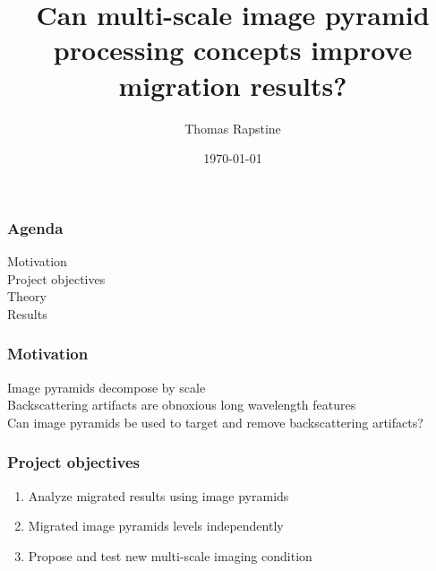 \title{Can multi-scale image pyramid processing concepts improve migration results?}
\author{Thomas Rapstine}
\date{\today}

\newcommand\FontSm{\fontsize{10pt}{5.0}\selectfont}
\newcommand\FontMd{\fontsize{14pt}{5.0}\selectfont}
\newcommand\FontLg{\fontsize{14pt}{5.0}\selectfont}

\maketitle
{}

\begin{frame} \frametitle{Agenda}
  \FontMd
  \begin{centering}
    Motivation \\
    \vspace{0.3in}
    Project objectives  \\
    \vspace{0.3in}
    Theory \\
    \vspace{0.3in}
    Results \\
  \end{centering}
\end{frame}

\begin{frame} \frametitle{Motivation}
  \FontMd
  \begin{centering}
    \vspace{0.4in}
    Image pyramids decompose by scale \\ 
    \vspace{0.4in}
    Backscattering artifacts are obnoxious long wavelength features\\ 
    \vspace{0.4in}
    Can image pyramids be used to target and remove backscattering artifacts?\\ 
  \end{centering}
\end{frame}

\begin{frame} \frametitle{Project objectives}
  \FontMd
  \begin{enumerate}
    \vspace{0.6in}
    \item Analyze migrated results using image pyramids 
    \vspace{0.6in}
    \item Migrated image pyramids levels independently 
    \vspace{0.6in}
    \item Propose and test new multi-scale imaging condition 
  \end{enumerate}
\end{frame}

